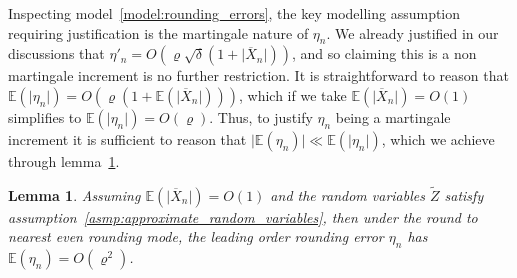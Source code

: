 \documentclass[9pt,a4paper,english]{extarticle}
\newtheorem{lemma}[theorem]{Lemma}
\begin{document}
Inspecting model~\ref{model:rounding_errors}, the key modelling assumption requiring justification is the martingale nature of $ \eta_n $. We already justified in our discussions that $ \eta'_n = O(\varrho\sqrt{\delta} (1 + \lvert \overline{X}_n\rvert)) $, and so claiming this is a non martingale increment is no further restriction. It is straightforward to reason that $ \mathbb{E}(\lvert \eta_n\rvert) = O(\varrho (1 + \mathbb{E}(\lvert\overline{X}_n\rvert))) $, which if we take $ \mathbb{E}(\lvert \overline{X}_n\rvert ) = O(1) $ simplifies to $ \mathbb{E}(\lvert \eta_n\rvert ) = O(\varrho) $. Thus, to justify $ \eta_n $ being a martingale increment it is sufficient to reason that $ \lvert \mathbb{E}(\eta_n)\rvert \ll \mathbb{E}(\lvert \eta_n\rvert )$, which we achieve through lemma~\ref{lemma:leading_order_error}.

\begin{lemma}
\label{lemma:leading_order_error}
Assuming $ \mathbb{E}(\lvert \overline{X}_n\rvert ) = O(1) $ and the random variables $ \widetilde{Z} $ satisfy assumption~\ref{asmp:approximate_random_variables}, then under the round to nearest even rounding mode, the leading order rounding error $ \eta_n $ has $ \mathbb{E}(\eta_n) = O(\varrho^2) $.
\end{lemma}
\end{document}
